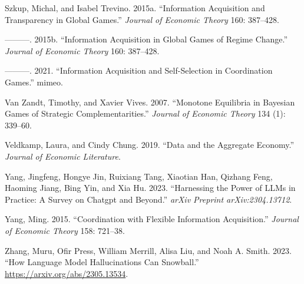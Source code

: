 \documentclass[
]{article}
\newlength{\cslhangindent}
\newenvironment{CSLReferences}[2] %
 {\begin{list}{}{%
  \setlength{\itemindent}{0pt}
  \setlength{\leftmargin}{0pt}
  \setlength{\parsep}{0pt}
  \ifodd #1
   \setlength{\leftmargin}{\cslhangindent}
   \setlength{\itemindent}{-1\cslhangindent}
  \fi
  \setlength{\itemsep}{#2\baselineskip}}}
 {\end{list}}
\theoremstyle{plain}
\theoremstyle{definition}
\theoremstyle{remark}
\begin{document}
\begin{CSLReferences}{1}{0}
Szkup, Michal, and Isabel Trevino. 2015a. {``Information Acquisition and
Transparency in Global Games.''} \emph{Journal of Economic Theory} 160:
387--428.

---------. 2015b. {``Information Acquisition in Global Games of Regime
Change.''} \emph{Journal of Economic Theory} 160: 387--428.

---------. 2021. {``Information Acquisition and Self-Selection in
Coordination Games.''} mimeo.

Van Zandt, Timothy, and Xavier Vives. 2007. {``Monotone Equilibria in
Bayesian Games of Strategic Complementarities.''} \emph{Journal of
Economic Theory} 134 (1): 339--60.

Veldkamp, Laura, and Cindy Chung. 2019. {``Data and the Aggregate
Economy.''} \emph{Journal of Economic Literature}.

Yang, Jingfeng, Hongye Jin, Ruixiang Tang, Xiaotian Han, Qizhang Feng,
Haoming Jiang, Bing Yin, and Xia Hu. 2023. {``Harnessing the Power of
LLMs in Practice: A Survey on Chatgpt and Beyond.''} \emph{arXiv
Preprint arXiv:2304.13712}.

Yang, Ming. 2015. {``Coordination with Flexible Information
Acquisition.''} \emph{Journal of Economic Theory} 158: 721--38.

Zhang, Muru, Ofir Press, William Merrill, Alisa Liu, and Noah A. Smith.
2023. {``How Language Model Hallucinations Can Snowball.''}
\url{https://arxiv.org/abs/2305.13534}.

\end{CSLReferences}
\end{document}
